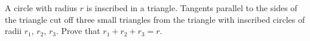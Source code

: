 A circle with radius $r$ is inscribed in a triangle. Tangents parallel to the sides of the triangle cut off three small triangles from the triangle with inscribed circles of radii $r_1$, $r_2$, $r_3$. Prove that $r_1 + r_2 + r_3 = r$.
